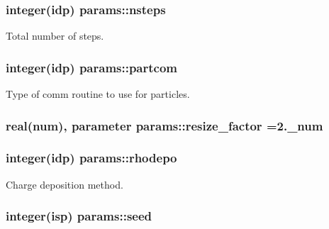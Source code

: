 \subsubsection[{\texorpdfstring{nsteps}{nsteps}}]{\setlength{\rightskip}{0pt plus 5cm}integer(idp) params\+::nsteps}\hypertarget{namespaceparams_af579aad3e0f1bb760fb94ef0bf1c4b0a}{}\label{namespaceparams_af579aad3e0f1bb760fb94ef0bf1c4b0a}


Total number of steps. 

\subsubsection[{\texorpdfstring{partcom}{partcom}}]{\setlength{\rightskip}{0pt plus 5cm}integer(idp) params\+::partcom}\hypertarget{namespaceparams_aa63204e737d29465924b4275b46ddfb3}{}\label{namespaceparams_aa63204e737d29465924b4275b46ddfb3}


Type of comm routine to use for particles. 

\subsubsection[{\texorpdfstring{resize\+\_\+factor}{resize_factor}}]{\setlength{\rightskip}{0pt plus 5cm}real(num), parameter params\+::resize\+\_\+factor =2.\+\_\+num}\hypertarget{namespaceparams_a70195e670ef122bc4f91d74793b68621}{}\label{namespaceparams_a70195e670ef122bc4f91d74793b68621}
\subsubsection[{\texorpdfstring{rhodepo}{rhodepo}}]{\setlength{\rightskip}{0pt plus 5cm}integer(idp) params\+::rhodepo}\hypertarget{namespaceparams_ae892561d7462a1e54b9b6b2bbe1adc4c}{}\label{namespaceparams_ae892561d7462a1e54b9b6b2bbe1adc4c}


Charge deposition method. 

\subsubsection[{\texorpdfstring{seed}{seed}}]{\setlength{\rightskip}{0pt plus 5cm}integer(isp) params\+::seed}\hypertarget{namespaceparams_ae32095407c8380779cfc1562a62d15e3}{}\label{namespaceparams_ae32095407c8380779cfc1562a62d15e3}
